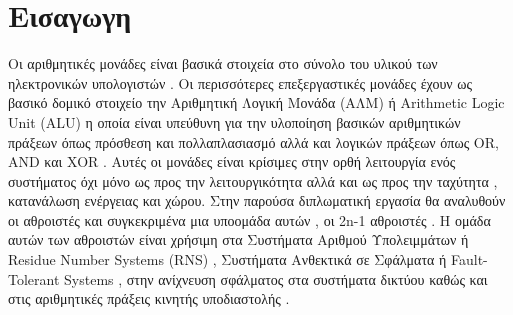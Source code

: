 
\section{Εισαγωγη}

Οι αριθμητικές μονάδες είναι βασικά στοιχεία στο σύνολο του υλικού των ηλεκτρονικών υπολογιστών . Οι περισσότερες επεξεργαστικές μονάδες έχουν ως βασικό δομικό στοιχείο την Αριθμητική Λογική Μονάδα (ΑΛΜ) ή Arithmetic Logic Unit (ALU) η οποία είναι υπεύθυνη για την υλοποίηση βασικών αριθμητικών πράξεων όπως πρόσθεση και πολλαπλασιασμό αλλά και λογικών πράξεων όπως OR, AND και XOR . Αυτές οι μονάδες είναι κρίσιμες στην ορθή λειτουργία ενός συστήματος όχι μόνο ως προς την λειτουργικότητα αλλά και ως προς την ταχύτητα , κατανάλωση ενέργειας και χώρου. Στην παρούσα διπλωματική εργασία θα αναλυθούν οι αθροιστές και συγκεκριμένα μια υποομάδα αυτών , οι 2n-1 αθροιστές . Η ομάδα αυτών των αθροιστών είναι χρήσιμη στα Συστήματα Αριθμού Υπολειμμάτων ή Residue Number Systems (RNS) , Συστήματα Ανθεκτικά σε Σφάλματα ή Fault-Tolerant Systems , στην ανίχνευση σφάλματος στα συστήματα δικτύου καθώς και στις αριθμητικές πράξεις κινητής υποδιαστολής \cite{j32_bit} \cite{j64_bit} \cite{vergos} \cite{modulo}.
